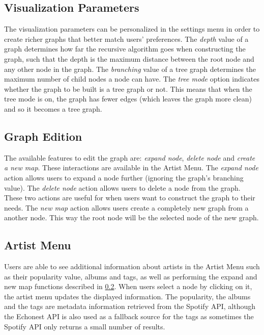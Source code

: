 \documentclass{article}
\begin{document}
    \subsection{Visualization Parameters}
    \label{sub:visualization_parameters}

      The visualization parameters can be personalized in the settings menu in order to create richer graphs that better match users' preferences.
      The \textit{depth} value of a graph determines how far the recursive algorithm goes when constructing the graph, such that the depth is the maximum distance between the root node and any other node in the graph.
      The \textit{branching} value of a tree graph determines the maximum number of child nodes a node can have.
      The \textit{tree mode} option indicates whether the graph to be built is a tree graph or not.
      This means that when the tree mode is on, the graph has fewer edges (which leaves the graph more clean) and so it becomes a tree graph.

    \subsection{Graph Edition}
    \label{sub:graph_edition}
      
      The available features to edit the graph are: \textit{expand node}, \textit{delete node} and \textit{create a new map}. These interactions are available in the Artist Menu.
      The \textit{expand node} action allows users to expand a node further (ignoring the graph's branching value).
      The \textit{delete node} action allows users to delete a node from the graph.
      These two actions are useful for when users want to construct the graph to their needs.
      The \emph{new map} action allows users create a completely new graph from a another node. This way the root node will be the selected node of the new graph.

    \subsection{Artist Menu}
    \label{sub:artist_menu}
    
      Users are able to see additional information about artists in the Artist Menu such as their popularity value, albums and tags, as well as performing the expand and new map functions described in \ref{sub:graph_edition}.
      When users select a node by clicking on it, the artist menu updates the displayed information.
      The popularity, the albums and the tags are metadata information retrieved from the Spotify API, although the Echonest API is also used as a fallback source for the tags  as sometimes the Spotify API only returns a small number of results.
\end{document}
